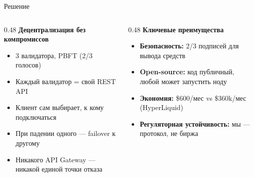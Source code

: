 \documentclass[aspectratio=169]{beamer}
\begin{document}
\begin{frame}{Решение}

\begin{columns}[t]
\begin{column}{0.48\textwidth}
\textbf{Децентрализация без компромиссов}
\begin{itemize}
    \item 3 валидатора, PBFT (2/3 голосов)
    \item Каждый валидатор = свой REST API
    \item Клиент сам выбирает, к кому подключаться
    \item При падении одного --- failover к другому
    \item Никакого API Gateway --- никакой единой точки отказа
\end{itemize}
\end{column}
\begin{column}{0.48\textwidth}
\textbf{Ключевые преимущества}
\begin{itemize}
    \item[\textcolor{green}{\checkmark}] \textbf{Безопасность:} 2/3 подписей для вывода средств
    \item[\textcolor{green}{\checkmark}] \textbf{Open-source:} код публичный, любой может запустить ноду
    \item[\textcolor{green}{\checkmark}] \textbf{Экономия:} \$600/мес vs \$360k/мес (HyperLiquid)
    \item[\textcolor{green}{\checkmark}] \textbf{Регуляторная устойчивость:} \dq мы --- протокол, не биржа\dq
\end{itemize}
\end{column}
\end{columns}
\end{frame}
\end{document}

